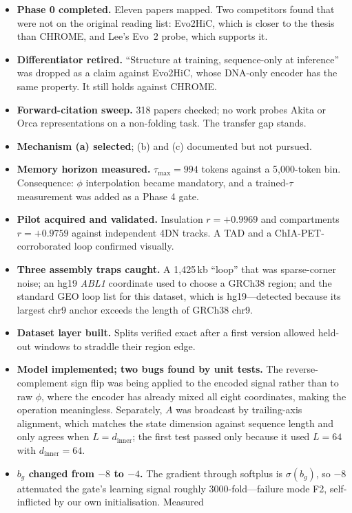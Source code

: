 \documentclass[11pt,a4paper]{article}
\begin{document}
\begin{itemize}
\item \textbf{Phase 0 completed.} Eleven papers mapped. Two competitors found
that were not on the original reading list: Evo2HiC, which is closer to the
thesis than CHROME, and Lee's Evo~2 probe, which supports it.
\item \textbf{Differentiator retired.} ``Structure at training, sequence-only at
inference'' was dropped as a claim against Evo2HiC, whose DNA-only encoder has
the same property. It still holds against CHROME.
\item \textbf{Forward-citation sweep.} 318 papers checked; no work probes Akita
or Orca representations on a non-folding task. The transfer gap stands.
\item \textbf{Mechanism (a) selected}; (b) and (c) documented but not pursued.
\item \textbf{Memory horizon measured.} $\tau_{\max} = 994$ tokens against a
5{,}000-token bin. Consequence: $\phi$ interpolation became mandatory, and a
trained-$\tau$ measurement was added as a Phase 4 gate.
\item \textbf{Pilot acquired and validated.} Insulation $r=+0.9969$ and
compartments $r=+0.9759$ against independent 4DN tracks. A TAD and a
ChIA-PET-corroborated loop confirmed visually.
\item \textbf{Three assembly traps caught.} A 1{,}425\,kb ``loop'' that was
sparse-corner noise; an hg19 \emph{ABL1} coordinate used to choose a GRCh38
region; and the standard GEO loop list for this dataset, which is hg19---detected
because its largest chr9 anchor exceeds the length of GRCh38 chr9.
\item \textbf{Dataset layer built.} Splits verified exact after a first version
allowed held-out windows to straddle their region edge.
\item \textbf{Model implemented; two bugs found by unit tests.} The
reverse-complement sign flip was being applied to the encoded signal rather than
to raw $\phi$, where the encoder has already mixed all eight coordinates,
making the operation meaningless. Separately, $A$ was broadcast by trailing-axis
alignment, which matches the state dimension against sequence length and only
agrees when $L = d_{\text{inner}}$; the first test passed only because it used
$L=64$ with $d_{\text{inner}}=64$.
\item \textbf{$b_g$ changed from $-8$ to $-4$.} The gradient through softplus is
$\sigma(b_g)$, so $-8$ attenuated the gate's learning signal roughly
3000-fold---failure mode F2, self-inflicted by our own initialisation. Measured

\end{itemize}
\end{document}
